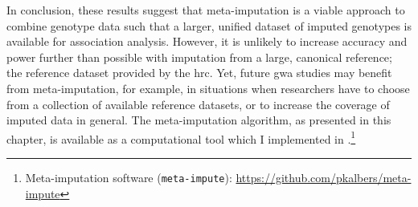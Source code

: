 In conclusion, these results suggest that meta-imputation is a viable approach to combine genotype data such that a larger, unified dataset of imputed genotypes is available for association analysis.
However, it is unlikely to increase accuracy and power further than possible with imputation from a large, canonical reference; \eg the reference dataset provided by the \acrfull{hrc}.
Yet, future \gls{gwa} studies may benefit from meta-imputation, for example, in situations when researchers have to choose from a collection of available reference datasets, or to increase the coverage of imputed data in general.
The meta-imputation algorithm, as presented in this chapter, is available as a computational tool which I implemented in \cpp.\footnote{Meta-imputation software (\texttt{meta-impute}): \url{https://github.com/pkalbers/meta-impute}}
